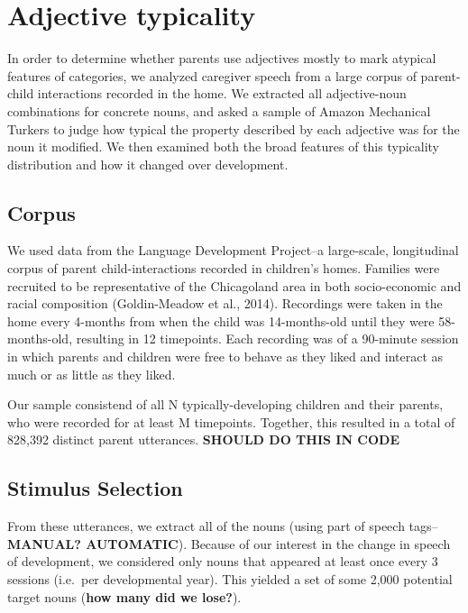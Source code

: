 \documentclass[10pt, letterpaper]{article}
\begin{document}
\hypertarget{adjective-typicality}{%
\section{Adjective typicality}\label{adjective-typicality}}

In order to determine whether parents use adjectives mostly to mark
atypical features of categories, we analyzed caregiver speech from a
large corpus of parent-child interactions recorded in the home. We
extracted all adjective-noun combinations for concrete nouns, and asked
a sample of Amazon Mechanical Turkers to judge how typical the property
described by each adjective was for the noun it modified. We then
examined both the broad features of this typicality distribution and how
it changed over development.

\hypertarget{corpus}{%
\subsection{Corpus}\label{corpus}}

We used data from the Language Development Project--a large-scale,
longitudinal corpus of parent child-interactions recorded in children's
homes. Families were recruited to be representative of the Chicagoland
area in both socio-economic and racial composition (Goldin-Meadow et
al., 2014). Recordings were taken in the home every 4-months from when
the child was 14-months-old until they were 58-months-old, resulting in
12 timepoints. Each recording was of a 90-minute session in which
parents and children were free to behave as they liked and interact as
much or as little as they liked.

Our sample consistend of all N typically-developing children and their
parents, who were recorded for at least M timepoints. Together, this
resulted in a total of 828,392 distinct parent utterances.
\textbf{SHOULD DO THIS IN CODE}

\hypertarget{stimulus-selection}{%
\subsection{Stimulus Selection}\label{stimulus-selection}}

From these utterances, we extract all of the nouns (using part of speech
tags--\textbf{MANUAL? AUTOMATIC}). Because of our interest in the change
in speech of development, we considered only nouns that appeared at
least once every 3 sessions (i.e.~per developmental year). This yielded
a set of some 2,000 potential target nouns (\textbf{how many did we
lose?}).
\end{document}
